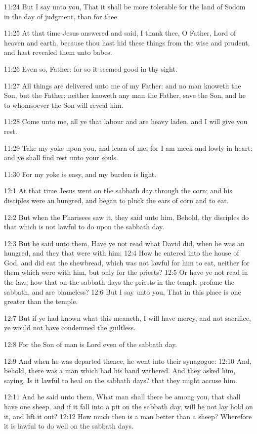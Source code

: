 11:24 But I say unto you, That it shall be more tolerable for the land of Sodom in the day of judgment, than for thee.

11:25 At that time Jesus answered and said, I thank thee, O Father, Lord of heaven and earth, because thou hast hid these things from the wise and prudent, and hast revealed them unto babes.

11:26 Even so, Father: for so it seemed good in thy sight.

11:27 All things are delivered unto me of my Father: and no man knoweth the Son, but the Father; neither knoweth any man the Father, save the Son, and he to whomsoever the Son will reveal him.

11:28 Come unto me, all ye that labour and are heavy laden, and I will give you rest.

11:29 Take my yoke upon you, and learn of me; for I am meek and lowly in heart: and ye shall find rest unto your souls.

11:30 For my yoke is easy, and my burden is light.

12:1 At that time Jesus went on the sabbath day through the corn; and his disciples were an hungred, and began to pluck the ears of corn and to eat.

12:2 But when the Pharisees saw it, they said unto him, Behold, thy disciples do that which is not lawful to do upon the sabbath day.

12:3 But he said unto them, Have ye not read what David did, when he was an hungred, and they that were with him; 12:4 How he entered into the house of God, and did eat the shewbread, which was not lawful for him to eat, neither for them which were with him, but only for the priests?  12:5 Or have ye not read in the law, how that on the sabbath days the priests in the temple profane the sabbath, and are blameless?  12:6 But I say unto you, That in this place is one greater than the temple.

12:7 But if ye had known what this meaneth, I will have mercy, and not sacrifice, ye would not have condemned the guiltless.

12:8 For the Son of man is Lord even of the sabbath day.

12:9 And when he was departed thence, he went into their synagogue: 12:10 And, behold, there was a man which had his hand withered. And they asked him, saying, Is it lawful to heal on the sabbath days? that they might accuse him.

12:11 And he said unto them, What man shall there be among you, that shall have one sheep, and if it fall into a pit on the sabbath day, will he not lay hold on it, and lift it out?  12:12 How much then is a man better than a sheep? Wherefore it is lawful to do well on the sabbath days.

